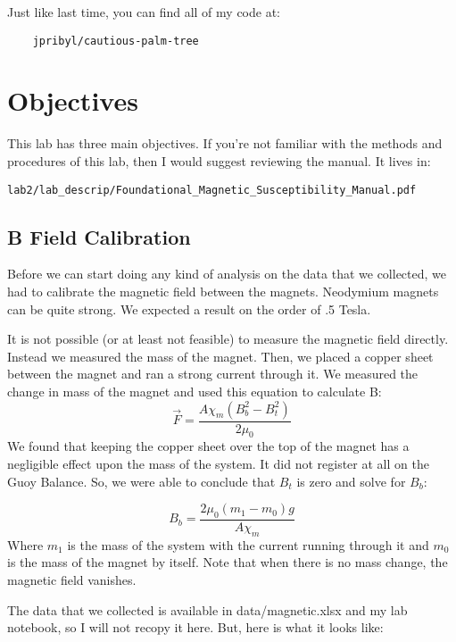 \documentclass{article}
\begin{document}
Just like last time, you can find all of my code at:
\begin{verbatim}
    jpribyl/cautious-palm-tree
\end{verbatim}

\section{Objectives}

This lab has three main objectives. If you're not familiar with the methods and
procedures of this lab, then I would suggest reviewing the manual. It lives in:

\begin{verbatim}
lab2/lab_descrip/Foundational_Magnetic_Susceptibility_Manual.pdf
\end{verbatim}

\subsection{B Field Calibration}
Before we can start doing any kind of analysis on the data that we collected,
we had to calibrate the magnetic field between the magnets. Neodymium magnets
can be quite strong. We expected a result on the order of .5 Tesla. 

It is not possible (or at least not feasible) to measure the magnetic field
directly. Instead we measured the mass of the magnet. Then, we placed a copper
sheet between the magnet and ran a strong current through it. We measured the
change in mass of the magnet and used this equation to calculate B:
$$\vec{F} = \frac{A \chi_m (B_{b}^{2} - B_{t}^{2})}{2 \mu_0}$$
We found that keeping the copper sheet over the top of the magnet has a
negligible effect upon the mass of the system. It did not register at all on
the Guoy Balance. So, we were able to conclude that $B_t$ is zero and solve for
$B_b$:

$$B_b = \frac{2 \mu_0 (m_1 - m_0) g}{A \chi_m}$$
Where $m_1$ is the mass of the system with the current running through it and
$m_0$ is the mass of the magnet by itself. Note that when there is no mass
change, the magnetic field vanishes.

The data that we collected is available in data/magnetic.xlsx 
and my lab notebook, so I will not recopy it here. But, here is what it looks
like:
\end{document}
